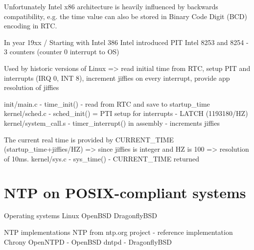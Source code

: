 Unfortunately Intel x86 architecture is heavily influenced by backwards compatibility,
e.g. the time value can also be stored in Binary Code Digit (BCD) encoding in RTC.

In year 19xx / Starting with Intel 386
Intel introduced
PIT Intel 8253 and 8254 - 3 counters (counter 0 interrupt to OS)


Used by historic versions of Linux
=> read initial time from RTC, setup PIT and interrupts (IRQ 0, INT 8), increment jiffies on every interrupt, provide app resolution of jiffies

init/main.c - time\_init() - read from RTC and save to startup\_time
kernel/sched.c - sched\_init() = PTI setup for interrupts - LATCH (1193180/HZ)
kernel/system\_call.s - timer\_interrupt() in assembly - increments jiffies

The current real time is provided by CURRENT\_TIME (startup\_time+jiffies/HZ) => since jiffies is integer and HZ is 100 => resolution of 10ms.
kernel/sys.c - sys\_time() - CURRENT\_TIME returned


\section{NTP on POSIX-compliant systems}
Operating systems
Linux
OpenBSD
DragonflyBSD

NTP implementations
NTP from ntp.org project - reference implementation
Chrony
OpenNTPD - OpenBSD
dntpd - DragonflyBSD

